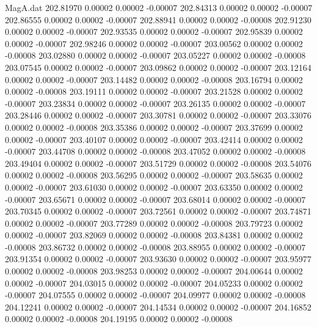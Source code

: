 \begin{filecontents}{MagA.dat}
 202.81970    0.00002    0.00002   -0.00007
 202.84313    0.00002    0.00002   -0.00007
 202.86555    0.00002    0.00002   -0.00007
 202.88941    0.00002    0.00002   -0.00008
 202.91230    0.00002    0.00002   -0.00007
 202.93535    0.00002    0.00002   -0.00007
 202.95839    0.00002    0.00002   -0.00007
 202.98246    0.00002    0.00002   -0.00007
 203.00562    0.00002    0.00002   -0.00008
 203.02880    0.00002    0.00002   -0.00007
 203.05227    0.00002    0.00002   -0.00008
 203.07545    0.00002    0.00002   -0.00007
 203.09862    0.00002    0.00002   -0.00007
 203.12164    0.00002    0.00002   -0.00007
 203.14482    0.00002    0.00002   -0.00008
 203.16794    0.00002    0.00002   -0.00008
 203.19111    0.00002    0.00002   -0.00007
 203.21528    0.00002    0.00002   -0.00007
 203.23834    0.00002    0.00002   -0.00007
 203.26135    0.00002    0.00002   -0.00007
 203.28446    0.00002    0.00002   -0.00007
 203.30781    0.00002    0.00002   -0.00007
 203.33076    0.00002    0.00002   -0.00008
 203.35386    0.00002    0.00002   -0.00007
 203.37699    0.00002    0.00002   -0.00007
 203.40107    0.00002    0.00002   -0.00007
 203.42414    0.00002    0.00002   -0.00007
 203.44708    0.00002    0.00002   -0.00008
 203.47052    0.00002    0.00002   -0.00008
 203.49404    0.00002    0.00002   -0.00007
 203.51729    0.00002    0.00002   -0.00008
 203.54076    0.00002    0.00002   -0.00008
 203.56295    0.00002    0.00002   -0.00007
 203.58635    0.00002    0.00002   -0.00007
 203.61030    0.00002    0.00002   -0.00007
 203.63350    0.00002    0.00002   -0.00007
 203.65671    0.00002    0.00002   -0.00007
 203.68014    0.00002    0.00002   -0.00007
 203.70345    0.00002    0.00002   -0.00007
 203.72561    0.00002    0.00002   -0.00007
 203.74871    0.00002    0.00002   -0.00007
 203.77289    0.00002    0.00002   -0.00008
 203.79723    0.00002    0.00002   -0.00007
 203.82069    0.00002    0.00002   -0.00008
 203.84381    0.00002    0.00002   -0.00008
 203.86732    0.00002    0.00002   -0.00008
 203.88955    0.00002    0.00002   -0.00007
 203.91354    0.00002    0.00002   -0.00007
 203.93630    0.00002    0.00002   -0.00007
 203.95977    0.00002    0.00002   -0.00008
 203.98253    0.00002    0.00002   -0.00007
 204.00644    0.00002    0.00002   -0.00007
 204.03015    0.00002    0.00002   -0.00007
 204.05233    0.00002    0.00002   -0.00007
 204.07555    0.00002    0.00002   -0.00007
 204.09977    0.00002    0.00002   -0.00008
 204.12241    0.00002    0.00002   -0.00007
 204.14534    0.00002    0.00002   -0.00007
 204.16852    0.00002    0.00002   -0.00008
 204.19195    0.00002    0.00002   -0.00008

\end{filecontents}
